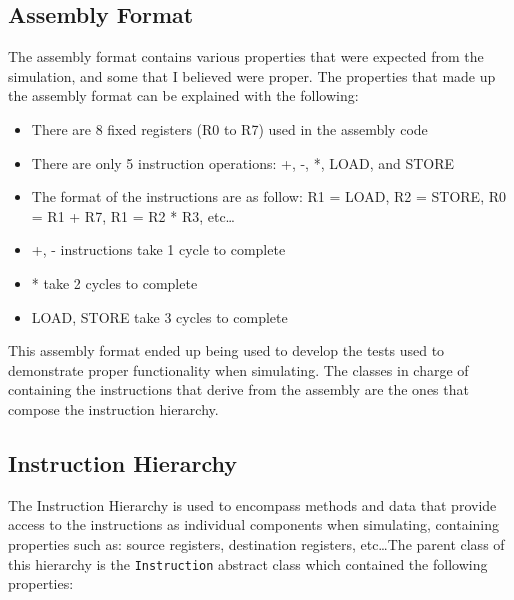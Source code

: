 \documentclass{article}
\begin{document}
\subsection{Assembly Format}
The assembly format contains various properties that were expected from the simulation, and some that I believed were proper. The properties that made up the assembly format can be explained with the following:

\begin{itemize}
    \item There are 8 fixed registers (R0 to R7) used in the assembly code
    \item There are only 5 instruction operations: +, -, *, LOAD, and STORE
    \item The format of the instructions are as follow: R1 = LOAD, R2 = STORE, R0 = R1 + R7, R1 = R2 * R3, etc\ldots
    \item +, - instructions take 1 cycle to complete
    \item * take 2 cycles to complete 
    \item LOAD, STORE take 3 cycles to complete
\end{itemize}

This assembly format ended up being used to develop the tests used to demonstrate proper functionality when simulating. The classes in charge of containing the instructions that derive from the assembly are the ones that compose the instruction hierarchy.

\subsection{Instruction Hierarchy}
The Instruction Hierarchy is used to encompass methods and data that provide access to the instructions as individual components when simulating, containing properties such as: source registers, destination registers, etc\ldots The parent class of this hierarchy is the \lstinline|Instruction| abstract class which contained the following properties:
\end{document}
